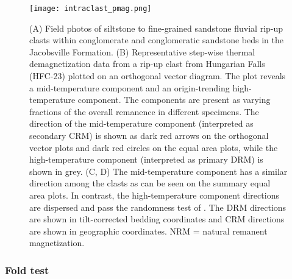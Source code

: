 \documentclass[draft]{agujournal2019}
\begin{document}
\begin{figure}[h!]
\centering
\texttt{[image: intraclast\_pmag.png]}
\caption{\scriptsize(A) Field photos of siltstone to fine-grained sandstone fluvial rip-up clasts within conglomerate and conglomeratic sandstone beds in the Jacobsville Formation. (B) Representative step-wise thermal demagnetization data from a rip-up clast from Hungarian Falls (HFC-23) plotted on an orthogonal vector diagram. The plot reveals a mid-temperature component and an origin-trending high-temperature component. The components are present as varying fractions of the overall remanence in different specimens. The direction of the mid-temperature component (interpreted as secondary CRM) is shown as dark red arrows on the orthogonal vector plots and dark red circles on the equal area plots, while the high-temperature component (interpreted as primary DRM) is shown in grey. (C, D) The mid-temperature component has a similar direction among the clasts as can be seen on the summary equal area plots. In contrast, the high-temperature component directions are dispersed and pass the randomness test of . The DRM directions are shown in tilt-corrected bedding coordinates and CRM directions are shown in geographic coordinates. NRM = natural remanent magnetization.}
\label{fig:intraclast_pmag}
\end{figure}

\subsubsection*{Fold test}
\end{document}

